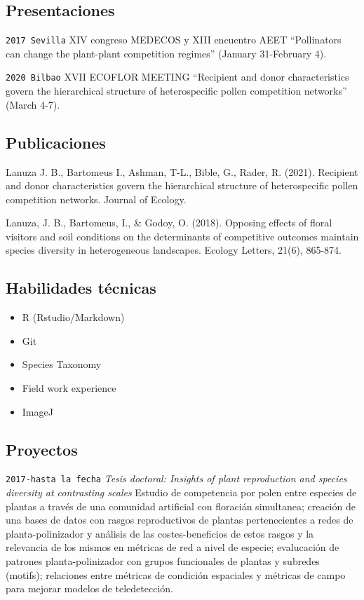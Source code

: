 \documentclass[
]{article}
\providecommand{\tightlist}{%
  \setlength{\itemsep}{0pt}\setlength{\parskip}{0pt}}
\begin{document}
\hypertarget{presentaciones}{%
\subsection{Presentaciones}\label{presentaciones}}

\texttt{2017\ Sevilla} XIV congreso MEDECOS y XIII encuentro AEET
``Pollinators can change the plant-plant competition regimes'' (January
31-February 4).

\texttt{2020\ Bilbao} XVII ECOFLOR MEETING ``Recipient and donor
characteristics govern the hierarchical structure of heterospecific
pollen competition networks'' (March 4-7).

\hypertarget{publicaciones}{%
\subsection{Publicaciones}\label{publicaciones}}

Lanuza J. B., Bartomeus I., Ashman, T-L., Bible, G., Rader, R. (2021).
Recipient and donor characteristics govern the hierarchical structure of
heterospecific pollen competition networks. Journal of Ecology.

Lanuza, J. B., Bartomeus, I., \& Godoy, O. (2018). Opposing effects of
floral visitors and soil conditions on the determinants of competitive
outcomes maintain species diversity in heterogeneous landscapes. Ecology
Letters, 21(6), 865-874.

\hypertarget{habilidades-tuxe9cnicas}{%
\subsection{Habilidades técnicas}\label{habilidades-tuxe9cnicas}}

\begin{itemize}
\tightlist
\item
  R (Rstudio/Markdown)
\item
  Git
\item
  Species Taxonomy
\item
  Field work experience
\item
  ImageJ
\end{itemize}

\hypertarget{proyectos}{%
\subsection{Proyectos}\label{proyectos}}

\texttt{2017-hasta\ la\ fecha} \emph{Tesis doctoral: Insights of plant
reproduction and species diversity at contrasting scales} Estudio de
competencia por polen entre especies de plantas a través de una
comunidad artificial con floracián simultanea; creación de una bases de
datos con rasgos reproductivos de plantas pertenecientes a redes de
planta-polinizador y análisis de las costes-beneficios de estos rasgos y
la relevancia de los mismos en métricas de red a nivel de especie;
evalucación de patrones planta-polinizador con grupos funcionales de
plantas y subredes (motifs); relaciones entre métricas de condición
espaciales y métricas de campo para mejorar modelos de teledetección.
\end{document}
